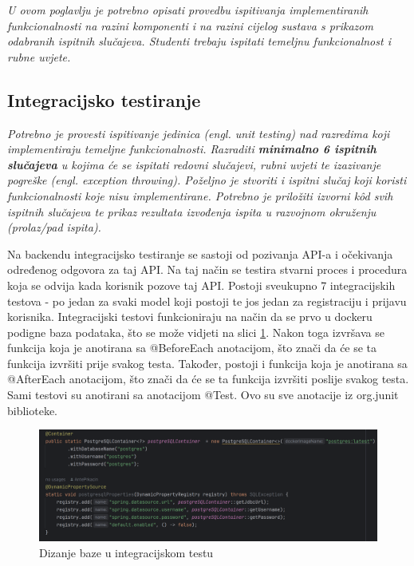 			 \textit{U ovom poglavlju je potrebno opisati provedbu ispitivanja implementiranih funkcionalnosti na razini komponenti i na razini cijelog sustava s prikazom odabranih ispitnih slučajeva. Studenti trebaju ispitati temeljnu funkcionalnost i rubne uvjete.}
	
			
			\subsection{Integracijsko testiranje}
			\textit{Potrebno je provesti ispitivanje jedinica (engl. unit testing) nad razredima koji implementiraju temeljne funkcionalnosti. Razraditi \textbf{minimalno 6 ispitnih slučajeva} u kojima će se ispitati redovni slučajevi, rubni uvjeti te izazivanje pogreške (engl. exception throwing). Poželjno je stvoriti i ispitni slučaj koji koristi funkcionalnosti koje nisu implementirane. Potrebno je priložiti izvorni kôd svih ispitnih slučajeva te prikaz rezultata izvođenja ispita u razvojnom okruženju (prolaz/pad ispita). }
			
			Na backendu integracijsko testiranje se sastoji od pozivanja API-a i očekivanja određenog odgovora za taj API.
            Na taj način se testira stvarni proces i procedura koja se odvija kada korisnik pozove taj API.
            Postoji sveukupno 7 integracijskih testova - po jedan za svaki model koji postoji te jos jedan za registraciju i prijavu korisnika.
            Integracijski testovi funkcioniraju na način da se prvo u dockeru podigne baza podataka, što se može vidjeti na slici \ref{fig:IT_docker}.
            Nakon toga izvršava se funkcija koja je anotirana sa @BeforeEach anotacijom, što znači da će se ta funkcija izvršiti prije svakog testa.
            Također, postoji i funkcija koja je anotirana sa @AfterEach anotacijom, što znači da će se ta funkcija izvršiti poslije svakog testa.
            Sami testovi su anotirani sa anotacijom @Test.
			Ovo su sve anotacije iz org.junit biblioteke.
            \begin{figure}[H]
                \includegraphics[scale=0.60]{slike/IT_containerized_docker.png}
                \centering
                \caption{Dizanje baze u integracijskom testu}
                \label{fig:IT_docker}
            \end{figure}

